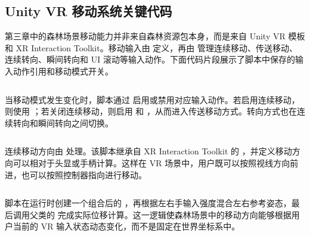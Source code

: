 \inputminted{text}{code/chapter3/StandardNoCulling.shader}

\subsection*{Unity VR 移动系统关键代码}

第三章中的森林场景移动能力并非来自森林资源包本身，而是来自 Unity VR 模板和 XR Interaction Toolkit。移动输入由  定义，再由  管理连续移动、传送移动、连续转向、瞬间转向和 UI 滚动等输入动作。下面代码片段展示了脚本中保存的输入动作引用和移动模式开关。

\inputminted[firstline=51,lastline=83,firstnumber=51]{csharp}{code/chapter3/ControllerInputActionManager.cs}

当移动模式发生变化时，脚本通过  启用或禁用对应输入动作。若启用连续移动，则使用 ；若关闭连续移动，则启用  和 ，从而进入传送移动方式。转向方式也在连续转向和瞬间转向之间切换。

\inputminted[firstline=458,lastline=468,firstnumber=458]{csharp}{code/chapter3/ControllerInputActionManager.cs}

连续移动方向由  处理。该脚本继承自 XR Interaction Toolkit 的 ，并定义移动方向可以相对于头显或手柄计算。这样在 VR 场景中，用户既可以按照视线方向前进，也可以按照控制器指向进行移动。

\inputminted[firstline=12,lastline=30,firstnumber=12]{csharp}{code/chapter3/DynamicMoveProvider.cs}

脚本在运行时创建一个组合后的 ，再根据左右手输入强度混合左右参考姿态，最后调用父类的  完成实际位移计算。这一逻辑使森林场景中的移动方向能够根据用户当前的 VR 输入状态动态变化，而不是固定在世界坐标系中。

\inputminted[firstline=102,lastline=187,firstnumber=102]{csharp}{code/chapter3/DynamicMoveProvider.cs}